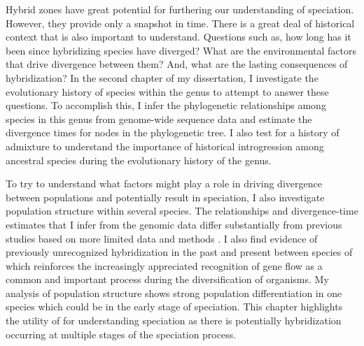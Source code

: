 Hybrid zones have great potential for furthering our understanding of speciation.
However, they provide only a snapshot in time. 
There is a great deal of historical context that is also important to understand. 
Questions such as, how long has it been since hybridizing species have diverged?
What are the environmental factors that drive divergence between them? 
And, what are the lasting consequences of hybridization?
In the second chapter of my dissertation, I investigate the evolutionary history of 
species within the genus \anaxyrus to attempt to answer these questions. 
To accomplish this, I infer the phylogenetic relationships among species in this genus
from genome-wide sequence data and estimate the divergence times for nodes in 
the phylogenetic tree. 
I also test for a history of admixture to understand the importance of 
historical introgression among ancestral species during the evolutionary history of the genus.

To try to understand what factors might play a role in driving divergence
between populations and potentially result in speciation, I also investigate 
population structure within several species.
The relationships and divergence-time estimates that I infer from the genomic 
data differ substantially from previous studies based on more limited data
and methods \parencite{fontenot2011,graybeal1997,masta2002,pramuk2007,pyron2011,portik2023}.
I also find evidence of previously unrecognized hybridization in the past and 
present between species of \anaxyrus which reinforces the increasingly appreciated 
recognition of gene flow as a common and important process during the 
diversification of organisms.
My analysis of population structure shows strong population differentiation
in one species which could be in the early stage of speciation. 
This chapter highlights the utility of \anaxyrus for understanding speciation
as there is potentially hybridization occurring at multiple stages of the 
speciation process. 

